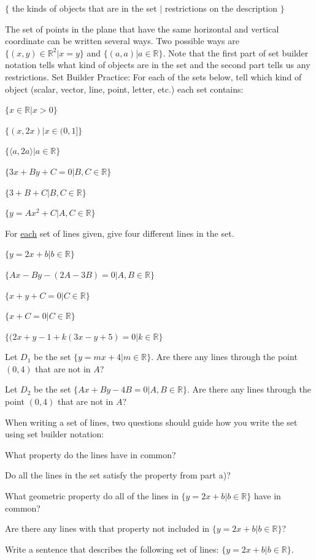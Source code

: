 $\{ $ the kinds of objects that are in the set $|$ restrictions on the description $\}$

The set of points in the plane that have the same horizontal and vertical coordinate can be written several ways. Two possible ways are $\{ (x,y) \in \mathbb{R}^2 | x=y\}$ and $\{(a,a)|a \in \mathbb{R} \}$. Note that the first part of set builder notation tells what kind of objects are in the set and the second part tells us any restrictions.
\bq
Set Builder Practice: For each of the sets below, tell which kind of object (scalar, vector, line, point, letter, etc.) each set contains:
\be
\item $\{ x \in \mathbb{R} | x >0 \}$
\item $\{ (x,2x) | x \in (0,1] \}$
\item $\{ \langle a,2a \rangle | a \in \mathbb{R} \}$
\item $\{ 3x+By+C=0 | B,C \in \mathbb{R} \}$
\item $\{ 3+B+C | B,C \in \mathbb{R} \}$
\item $\{ y=A x^2 +C | A,C \in \mathbb{R} \}$
\ee
\eq

\bq For \underline{each} set of lines given, give four different lines in the set.
\be
\item $\{ y=2x+b| b \in \mathbb{R}\}$
\item $\{ Ax-By-(2A-3B)=0| A,B \in \mathbb{R} \}$
\item $\{ x+y+C=0| C \in \mathbb{R} \}$
\item $\{ x+C=0| C \in \mathbb{R}\}$
\item $\{ (2x+y-1+k(3x-y+5)=0| k \in \mathbb{R}\}$
\ee
\eq

\bq
\be
\item Let $D_1$ be the set $\{ y=mx+4| m \in \mathbb{R}\}$. Are there any lines through the point $(0,4)$ that are not in $A$?
\item Let $D_2$ be the set $\{ Ax+By-4B=0 | A,B \in \mathbb{R}\}$. Are there any lines through the point $(0,4)$ that are not in $A$?
\ee
\eq

When writing a set of lines, two questions should guide how you write the set using set builder notation:
\be
\item What property do the lines have in common?
\item Do all the lines in the set satisfy the property from part a)?
\ee

\bq \be
\item What geometric property do all of the lines in $\{ y=2x+b| b \in \mathbb{R}\}$ have in common?
\item Are there any lines with that property not included in $\{ y=2x+b| b \in \mathbb{R}\}$?
\item Write a sentence that describes the following set of lines: $\{ y=2x+b| b \in \mathbb{R}\}$.

